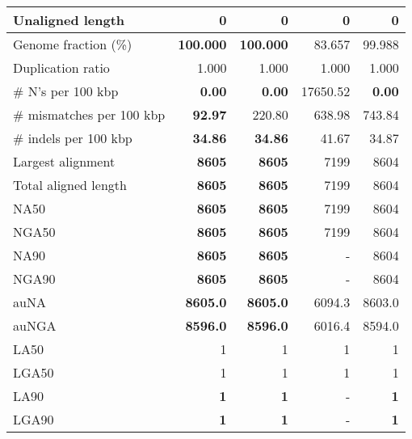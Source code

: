 \documentclass[12pt,a4paper]{article}
\begin{document}
\begin{table}[ht]
\begin{center}
\begin{tabular}{|l*{4}{|r}|}
Unaligned length & 0 & 0 & 0 & 0 \\ \hline
Genome fraction (\%) & {\bf 100.000} & {\bf 100.000} & 83.657 & 99.988 \\ \hline
Duplication ratio & 1.000 & 1.000 & 1.000 & 1.000 \\ \hline
\# N's per 100 kbp & {\bf 0.00} & {\bf 0.00} & 17650.52 & {\bf 0.00} \\ \hline
\# mismatches per 100 kbp & {\bf 92.97} & 220.80 & 638.98 & 743.84 \\ \hline
\# indels per 100 kbp & {\bf 34.86} & {\bf 34.86} & 41.67 & 34.87 \\ \hline
Largest alignment & {\bf 8605} & {\bf 8605} & 7199 & 8604 \\ \hline
Total aligned length & {\bf 8605} & {\bf 8605} & 7199 & 8604 \\ \hline
NA50 & {\bf 8605} & {\bf 8605} & 7199 & 8604 \\ \hline
NGA50 & {\bf 8605} & {\bf 8605} & 7199 & 8604 \\ \hline
NA90 & {\bf 8605} & {\bf 8605} & - & 8604 \\ \hline
NGA90 & {\bf 8605} & {\bf 8605} & - & 8604 \\ \hline
auNA & {\bf 8605.0} & {\bf 8605.0} & 6094.3 & 8603.0 \\ \hline
auNGA & {\bf 8596.0} & {\bf 8596.0} & 6016.4 & 8594.0 \\ \hline
LA50 & 1 & 1 & 1 & 1 \\ \hline
LGA50 & 1 & 1 & 1 & 1 \\ \hline
LA90 & {\bf 1} & {\bf 1} & - & {\bf 1} \\ \hline
LGA90 & {\bf 1} & {\bf 1} & - & {\bf 1} \\ \hline
\end{tabular}
\end{center}
\end{table}
\end{document}
